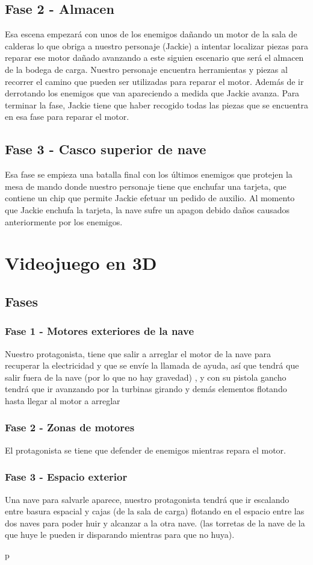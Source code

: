 \subsection{Fase 2 - Almacen}
Esa escena empezará con unos de los enemigos dañando un motor de la sala de calderas lo que obriga a nuestro personaje (Jackie) a intentar localizar piezas para reparar ese motor dañado avanzando a este siguien escenario que será el almacen de la bodega de carga.
Nuestro personaje encuentra herramientas y piezas al 
recorrer el camino que pueden ser utilizadas para reparar el motor.
Además de ir derrotando los enemigos que van apareciendo a medida que Jackie avanza.
Para terminar la fase, Jackie tiene que haber recogido todas las piezas que se encuentra en esa fase para reparar el motor.

\subsection{Fase 3 - Casco superior de nave}

Esa fase se empieza una batalla final con los últimos enemigos que protejen la mesa de mando donde nuestro personaje tiene que enchufar una tarjeta, que contiene un chip que permite Jackie efetuar un pedido de auxilio. Al momento que Jackie enchufa la tarjeta, la nave sufre un apagon debido daños causados anteriormente por los enemigos.

\section{Videojuego en 3D}

\subsection{Fases}
\subsubsection{Fase 1 - Motores exteriores de la nave}
Nuestro protagonista, tiene que salir a arreglar el motor de la nave para recuperar la electricidad y
 que se envíe la llamada de ayuda, así que tendrá que salir fuera de la nave (por lo que no hay gravedad) ,
  y con su pistola gancho tendrá que ir avanzando por la turbinas girando y demás elementos flotando
   hasta llegar al motor a arreglar 

\subsubsection{Fase 2 - Zonas de motores}
El protagonista se tiene que defender de enemigos mientras repara el motor.

\subsubsection{Fase 3 - Espacio exterior}
Una nave para salvarle aparece, nuestro protagonista tendrá que ir escalando entre basura espacial y cajas
(de la sala de carga) flotando en el espacio entre las dos naves para poder huir y alcanzar a la otra nave.
(las torretas de la nave de la que huye le pueden ir disparando mientras para que no huya).

p